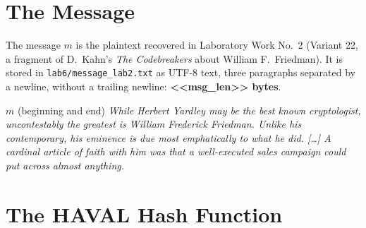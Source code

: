 \documentclass[12pt,a4paper]{article}
\begin{document}
\section{The Message}
The message $m$ is the plaintext recovered in Laboratory Work No.~2 (Variant 22, a fragment of
D.~Kahn's \emph{The Codebreakers} about William F.~Friedman). It is stored in
\texttt{lab6/message\_lab2.txt} as UTF-8 text, three paragraphs separated by a newline, without a
trailing newline: \textbf{<<msg_len>> bytes}.
\begin{infobox}{$m$ (beginning and end)}
\small\itshape While Herbert Yardley may be the best known cryptologist, uncontestably the greatest
is William Frederick Friedman. Unlike his contemporary, his eminence is due most emphatically to
what he did. [\dots] A cardinal article of faith with him was that a well-executed sales campaign
could put across almost anything.
\end{infobox}

\section{The HAVAL Hash Function}
\end{document}
